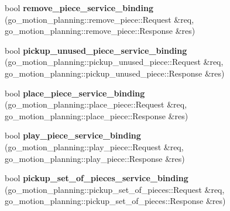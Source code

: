 \begin{DoxyCompactItemize}
bool {\bfseries remove\+\_\+piece\+\_\+service\+\_\+binding} (go\+\_\+motion\+\_\+planning\+::remove\+\_\+piece\+::\+Request \&req, go\+\_\+motion\+\_\+planning\+::remove\+\_\+piece\+::\+Response \&res)
\item 
\mbox{\label{classgo__motion__planner_a21ff70114c6e31d121352c8bf9c7a962}} 
bool {\bfseries pickup\+\_\+unused\+\_\+piece\+\_\+service\+\_\+binding} (go\+\_\+motion\+\_\+planning\+::pickup\+\_\+unused\+\_\+piece\+::\+Request \&req, go\+\_\+motion\+\_\+planning\+::pickup\+\_\+unused\+\_\+piece\+::\+Response \&res)
\item 
\mbox{\label{classgo__motion__planner_ab93c5f49f503441b9e3917a8bfb31e73}} 
bool {\bfseries place\+\_\+piece\+\_\+service\+\_\+binding} (go\+\_\+motion\+\_\+planning\+::place\+\_\+piece\+::\+Request \&req, go\+\_\+motion\+\_\+planning\+::place\+\_\+piece\+::\+Response \&res)
\item 
\mbox{\label{classgo__motion__planner_a774c19f7198702545b74c71b98efa538}} 
bool {\bfseries play\+\_\+piece\+\_\+service\+\_\+binding} (go\+\_\+motion\+\_\+planning\+::play\+\_\+piece\+::\+Request \&req, go\+\_\+motion\+\_\+planning\+::play\+\_\+piece\+::\+Response \&res)
\item 
\mbox{\label{classgo__motion__planner_a89fdde820a08474e8b43d1ef5b69e8fd}} 
bool {\bfseries pickup\+\_\+set\+\_\+of\+\_\+pieces\+\_\+service\+\_\+binding} (go\+\_\+motion\+\_\+planning\+::pickup\+\_\+set\+\_\+of\+\_\+pieces\+::\+Request \&req, go\+\_\+motion\+\_\+planning\+::pickup\+\_\+set\+\_\+of\+\_\+pieces\+::\+Response \&res)
\end{DoxyCompactItemize}
